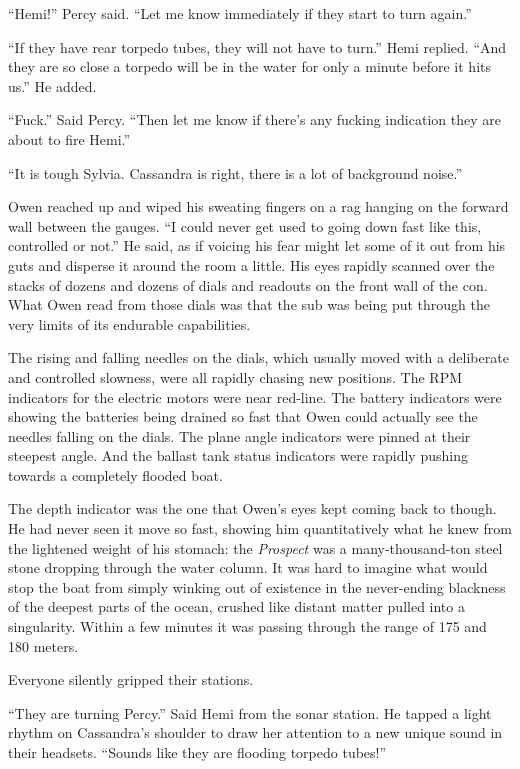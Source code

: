 \documentclass[
]{scrbook}
\begin{document}
``Hemi!'' Percy said. ``Let me know immediately if they start to turn
again.''

``If they have rear torpedo tubes, they will not have to turn.'' Hemi
replied. ``And they are so close a torpedo will be in the water for only
a minute before it hits us.'' He added.

``Fuck.'' Said Percy. ``Then let me know if there's any fucking
indication they are about to fire Hemi.''

``It is tough Sylvia. Cassandra is right, there is a lot of background
noise.''

Owen reached up and wiped his sweating fingers on a rag hanging on the
forward wall between the gauges. ``I could never get used to going down
fast like this, controlled or not.'' He said, as if voicing his fear
might let some of it out from his guts and disperse it around the room a
little. His eyes rapidly scanned over the stacks of dozens and dozens of
dials and readouts on the front wall of the con. What Owen read from
those dials was that the sub was being put through the very limits of
its endurable capabilities.

The rising and falling needles on the dials, which usually moved with a
deliberate and controlled slowness, were all rapidly chasing new
positions. The RPM indicators for the electric motors were near
red-line. The battery indicators were showing the batteries being
drained so fast that Owen could actually see the needles falling on the
dials. The plane angle indicators were pinned at their steepest angle.
And the ballast tank status indicators were rapidly pushing towards a
completely flooded boat.

The depth indicator was the one that Owen's eyes kept coming back to
though. He had never seen it move so fast, showing him quantitatively
what he knew from the lightened weight of his stomach: the
\emph{Prospect} was a many-thousand-ton steel stone dropping through the
water column. It was hard to imagine what would stop the boat from
simply winking out of existence in the never-ending blackness of the
deepest parts of the ocean, crushed like distant matter pulled into a
singularity. Within a few minutes it was passing through the range of
175 and 180 meters.

Everyone silently gripped their stations.

``They are turning Percy.'' Said Hemi from the sonar station. He tapped
a light rhythm on Cassandra's shoulder to draw her attention to a new
unique sound in their headsets. ``Sounds like they are flooding torpedo
tubes!''
\end{document}
